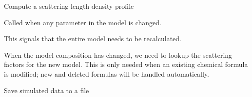\documentclass[letterpaper,10pt,english]{sphinxmanual}
\begin{document}
\begin{fulllineitems}
\begin{fulllineitems}
\label{api/dist:refl1d.dist.DistributionExperiment.step_profile}
Compute a scattering length density profile

\end{fulllineitems}


\begin{fulllineitems}
\label{api/dist:refl1d.dist.DistributionExperiment.update}
Called when any parameter in the model is changed.

This signals that the entire model needs to be recalculated.

\end{fulllineitems}


\begin{fulllineitems}
\label{api/dist:refl1d.dist.DistributionExperiment.update_composition}
When the model composition has changed, we need to lookup the
scattering factors for the new model.  This is only needed
when an existing chemical formula is modified; new and
deleted formulas will be handled automatically.

\end{fulllineitems}


\begin{fulllineitems}
\label{api/dist:refl1d.dist.DistributionExperiment.write_data}
Save simulated data to a file

\end{fulllineitems}


\end{fulllineitems}

\end{document}
